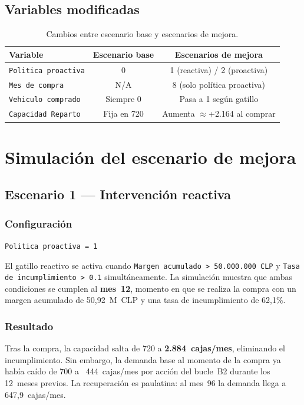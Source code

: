 \documentclass[10pt,a4paper]{article}
\begin{document}
\subsection{Variables modificadas}

\begin{table}[H]
\centering
\begin{tabular}{lcc}
\toprule
Variable & Escenario base & Escenarios de mejora \\
\midrule
\texttt{Politica proactiva} & 0 & 1 (reactiva) / 2 (proactiva) \\
\texttt{Mes de compra} & N/A & 8 (solo política proactiva) \\
\texttt{Vehiculo comprado} & Siempre 0 & Pasa a 1 según gatillo \\
\texttt{Capacidad Reparto} & Fija en 720 & Aumenta $\approx$+2.164 al comprar \\
\bottomrule
\end{tabular}
\caption{Cambios entre escenario base y escenarios de mejora.}
\end{table}

\newpage

\section{Simulación del escenario de mejora}

\subsection{Escenario 1 --- Intervención reactiva}

\subsubsection*{Configuración}
\texttt{Politica proactiva = 1}

El gatillo reactivo se activa cuando \texttt{Margen acumulado > 50.000.000 CLP} y \texttt{Tasa de incumplimiento > 0.1} simultáneamente. La simulación muestra que ambas condiciones se cumplen al \textbf{mes~12}, momento en que se realiza la compra con un margen acumulado de 50,92~M~CLP y una tasa de incumplimiento de 62,1\%.

\subsubsection*{Resultado}
Tras la compra, la capacidad salta de 720 a \textbf{2.884~cajas/mes}, eliminando el incumplimiento. Sin embargo, la demanda base al momento de la compra ya había caído de 700 a ~444~cajas/mes por acción del bucle~B2 durante los 12~meses previos. La recuperación es paulatina: al mes~96 la demanda llega a 647,9~cajas/mes.
\end{document}
